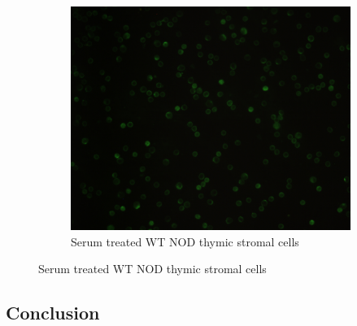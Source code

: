 \begin{figure}
	\begin{subfigure}{\textwidth}
		\includegraphics[width=\textwidth]{Figures/WTserum2.jpg}
		\caption{Serum treated WT NOD thymic stromal cells}
	\end{subfigure}
\end{figure}

\subsection{Conclusion}


